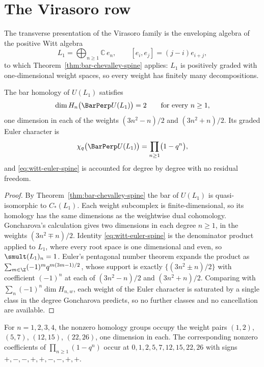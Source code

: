\section{The Virasoro row}

The transverse presentation of the Virasoro family is the enveloping algebra of
the positive Witt algebra
\[
 L_1=\bigoplus_{n\ge1}\mathbb C\,e_n,
 \qquad
 [e_i,e_j]=(j-i)e_{i+j},
\]
to which Theorem~\ref{thm:bar-chevalley-spine} applies: $L_1$ is positively
graded with one-dimensional weight spaces, so every weight has finitely many
decompositions.

\begin{theorem}
\label{thm:pentagonal-spine}
The bar homology of $U(L_1)$ satisfies
\[
 \dim H_n\bigl(\BarPerp U(L_1)\bigr)=2
 \qquad\text{for every }n\ge1,
\]
one dimension in each of the weights $(3n^2-n)/2$ and $(3n^2+n)/2$. Its graded
Euler character is
\begin{equation}
\label{eq:witt-euler-spine}
 \chi_q\bigl(\BarPerp U(L_1)\bigr)=\prod_{n\ge1}\bigl(1-q^n\bigr),
\end{equation}
and \eqref{eq:witt-euler-spine} is accounted for degree by degree with no
residual freedom.
\end{theorem}
\begin{proof}
By Theorem~\ref{thm:bar-chevalley-spine} the bar of $U(L_1)$ is quasi-isomorphic to $C_*(L_1)$.
Each weight subcomplex is finite-dimensional, so its homology has the same
dimensions as the weightwise dual cohomology. Goncharova's calculation gives
two dimensions in each degree $n\ge1$, in the weights $(3n^2\mp n)/2$. Identity \eqref{eq:witt-euler-spine} is the
denominator product applied to $L_1$, where every root space is one dimensional
and even, so $\smult(L_1)_n=1$. Euler's pentagonal number theorem expands the
product as $\sum_{m\in\Z}(-1)^mq^{m(3m-1)/2}$, whose support is exactly
$\{(3n^2\pm n)/2\}$ with coefficient $(-1)^n$ at each of $(3n^2-n)/2$ and
$(3n^2+n)/2$. Comparing with $\sum_n(-1)^n\dim H_{n,w}$, each weight of the Euler
character is saturated by a single class in the degree Goncharova predicts, so
no further classes and no cancellation are available.
\end{proof}

For $n=1,2,3,4$, the nonzero homology groups occupy the weight pairs
$(1,2)$, $(5,7)$, $(12,15)$, $(22,26)$, one dimension in each.
The corresponding nonzero coefficients of $\prod_{n\ge1}(1-q^n)$ occur at
$0,1,2,5,7,12,15,22,26$ with signs $+,-,-,+,+,-,-,+,+$.

